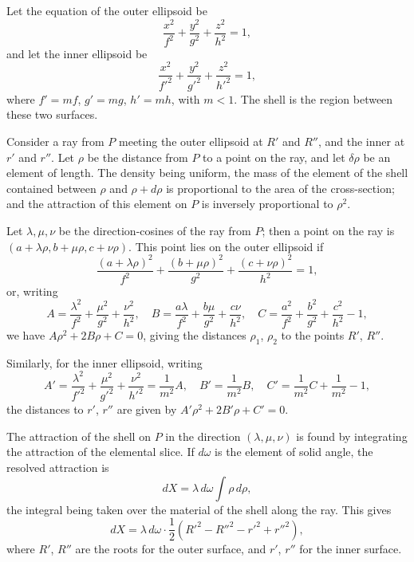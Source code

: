 \documentclass[11pt,a4paper]{book}
\begin{document}
\begin{art}
Let the equation of the outer ellipsoid be
\[
\frac{x^2}{f^2} + \frac{y^2}{g^2} + \frac{z^2}{h^2} = 1,
\]
and let the inner ellipsoid be
\[
\frac{x^2}{f'^2} + \frac{y^2}{g'^2} + \frac{z^2}{h'^2} = 1,
\]
where $f' = mf$, $g' = mg$, $h' = mh$, with $m < 1$. The shell is the region between these two surfaces.
\end{art}

\begin{art}
Consider a ray from $P$ meeting the outer ellipsoid at $R'$ and $R''$, and the inner at $r'$ and $r''$. Let $\rho$ be the distance from $P$ to a point on the ray, and let $\delta\rho$ be an element of length. The density being uniform, the mass of the element of the shell contained between $\rho$ and $\rho + d\rho$ is proportional to the area of the cross-section; and the attraction of this element on $P$ is inversely proportional to $\rho^2$.
\end{art}

\begin{art}
Let $\lambda, \mu, \nu$ be the direction-cosines of the ray from $P$; then a point on the ray is $(a + \lambda\rho, b + \mu\rho, c + \nu\rho)$. This point lies on the outer ellipsoid if
\[
\frac{(a + \lambda\rho)^2}{f^2} + \frac{(b + \mu\rho)^2}{g^2} + \frac{(c + \nu\rho)^2}{h^2} = 1,
\]
or, writing
\[
A = \frac{\lambda^2}{f^2} + \frac{\mu^2}{g^2} + \frac{\nu^2}{h^2},\quad
B = \frac{a\lambda}{f^2} + \frac{b\mu}{g^2} + \frac{c\nu}{h^2},\quad
C = \frac{a^2}{f^2} + \frac{b^2}{g^2} + \frac{c^2}{h^2} - 1,
\]
we have $A\rho^2 + 2B\rho + C = 0$, giving the distances $\rho_1$, $\rho_2$ to the points $R'$, $R''$.
\end{art}

\begin{art}
Similarly, for the inner ellipsoid, writing
\[
A' = \frac{\lambda^2}{f'^2} + \frac{\mu^2}{g'^2} + \frac{\nu^2}{h'^2}
= \frac{1}{m^2}A,\quad
B' = \frac{1}{m^2}B,\quad
C' = \frac{1}{m^2}C + \frac{1}{m^2} - 1,
\]
the distances to $r'$, $r''$ are given by $A'\rho^2 + 2B'\rho + C' = 0$.
\end{art}

\begin{art}
The attraction of the shell on $P$ in the direction $(\lambda, \mu, \nu)$ is found by integrating the attraction of the elemental slice. If $d\omega$ is the element of solid angle, the resolved attraction is
\[
dX = \lambda\,d\omega\int \rho\,d\rho,
\]
the integral being taken over the material of the shell along the ray. This gives
\[
dX = \lambda\,d\omega \cdot \frac{1}{2}(R'^2 - R''^2 - r'^2 + r''^2),
\]
where $R'$, $R''$ are the roots for the outer surface, and $r'$, $r''$ for the inner surface.
\end{art}
\end{document}
